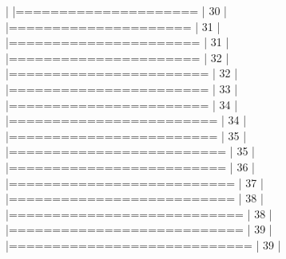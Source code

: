 \documentclass{article}
\begin{document}
\begin{Schunk}
\begin{Soutput}
  |                                                                            
  |=====================                                                 |  30%
  |                                                                            
  |=====================                                                 |  31%
  |                                                                            
  |======================                                                |  31%
  |                                                                            
  |======================                                                |  32%
  |                                                                            
  |=======================                                               |  32%
  |                                                                            
  |=======================                                               |  33%
  |                                                                            
  |=======================                                               |  34%
  |                                                                            
  |========================                                              |  34%
  |                                                                            
  |========================                                              |  35%
  |                                                                            
  |=========================                                             |  35%
  |                                                                            
  |=========================                                             |  36%
  |                                                                            
  |==========================                                            |  37%
  |                                                                            
  |==========================                                            |  38%
  |                                                                            
  |===========================                                           |  38%
  |                                                                            
  |===========================                                           |  39%
  |                                                                            
  |============================                                          |  39%
  |                                                                            

\end{Soutput}
\end{Schunk}
\end{document}
